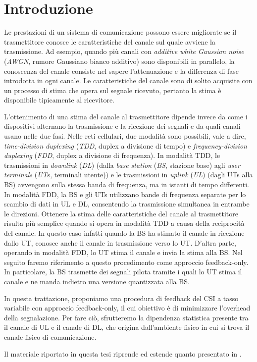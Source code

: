 \chapter{Introduzione}

\thispagestyle{empty}

\vspace{9.1pt}  %

Le prestazioni di un sistema di comunicazione possono essere migliorate se il
trasmettitore conosce le caratteristiche del canale sul quale avviene la
trasmissione. Ad esempio, quando più canali con \textit{additive white Gaussian
noise} (\textit{AWGN}, rumore Gaussiano bianco additivo) sono disponibili in
parallelo, la conoscenza del canale consiste nel sapere l'attenuazione e la
differenza di fase introdotta in ogni canale. Le caratteristiche del canale
sono di solito acquisite con un processo di stima che opera sul segnale
ricevuto, pertanto la stima è disponibile tipicamente al ricevitore.

L'ottenimento di una stima del canale al trasmettitore dipende invece da come i
dispositivi alternano la trasmissione e la ricezione dei segnali e da quali
canali usano nelle due fasi. Nelle reti cellulari, due modalità sono possibili,
vale a dire, \textit{time-division duplexing} (\textit{TDD}, duplex a divisione
di tempo) e \textit{frequency-division duplexing} (\textit{FDD}, duplex a
divisione di frequenza). In modalità TDD, le trasmissioni in \textit{downlink}
(\textit{DL}) (dalla \textit{base station} (\textit{BS}, stazione base) agli
\textit{user terminals} (\textit{UT}s, terminali utente)) e le trasmissioni in
\textit{uplink} (\textit{UL}) (dagli UTs alla BS) avvengono sulla stessa banda
di frequenza, ma in istanti di tempo differenti. In modalità FDD, la BS e gli
UTs utilizzano bande di frequenza separate per lo scambio di dati in UL e DL,
consentendo la trasmissione simultanea in entrambe le direzioni. Ottenere la
stima delle caratteristiche del canale al trasmettitore risulta più semplice
quando si opera in modalità TDD a causa della reciprocità del canale. In questo
caso infatti quando la BS ha stimato il canale in ricezione dallo UT, conosce
anche il canale in trasmissione verso lo UT. D'altra parte, operando in
modalità FDD, lo UT stima il canale e invia la stima alla BS. Nel seguito
faremo riferimento a questo procedimento come approccio feedback-only. In
particolare, la BS trasmette dei segnali pilota tramite i quali lo UT stima il
canale e ne manda indietro una versione quantizzata alla BS.

In questa trattazione, proponiamo una procedura di feedback del CSI a tasso
variabile con approccio feedback-only, il cui obiettivo è di minimizzare
l'overhead della segnalazione. Per fare ciò, sfrutteremo la dipendenza
statistica presente tra il canale di UL e il canale di DL, che origina
dall'ambiente fisico in cui si trova il canale fisico di comunicazione.

Il materiale riportato in questa tesi riprende ed estende quanto presentato in
\cite{https://doi.org/10.1002/ett.3628}.


